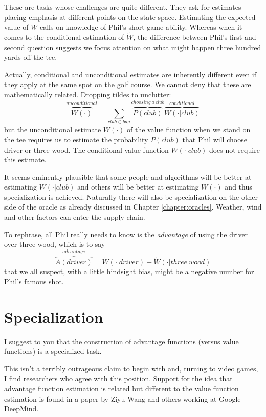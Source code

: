 These are tasks whose challenges are quite different. They ask for estimates placing emphasis at different points on the state space. Estimating the expected value of $W$ calls on knowledge of Phil's short game ability. Whereas when it comes to the conditional estimation of $\tilde{W}$, the difference between Phil's first and second question suggests we focus attention on what might happen three hundred yards off the tee.   

Actually, conditional and unconditional estimates are inherently different even if they apply at the same spot on the golf course. We cannot deny that these are mathematically related. Dropping tildes to unclutter:
$$
           \overbrace{W(\cdot)}^{unconditional} = \sum_{club \in bag} \overbrace{P(club)}^{choosing\ a\ club } \overbrace{W(\cdot | club)}^{conditional}
$$
but the unconditional estimate $W(\cdot)$ of the value function when we stand on the tee requires us to estimate the probability $P(club)$ that Phil will choose driver or three wood. The conditional value function $W(\cdot|club)$ does not require this estimate. 

It seems eminently plausible that some people and algorithms will be better at estimating $W(\cdot|club)$ and others will be better at estimating $W(\cdot)$ and thus specialization is achieved. Naturally there will also be  specialization on the other side of the oracle as already discussed in Chapter \ref{chapter:oracles}. Weather, wind and other factors can enter the supply chain. 

To rephrase, all Phil really needs to know is the {\em advantage} of using the driver over three wood, which is to say 
$$
       \overbrace{A(driver)}^{advantage} = \tilde{W}(\cdot|driver) - \tilde{W}(\cdot|three\ wood)
$$
that we all suspect, with a little hindsight bias, might be a negative number for Phil's famous shot. 

\section{Specialization}

I suggest to you that the construction of advantage functions (versus value functions) is a specialized task. 

This isn't a terribly outrageous claim to begin with and, turning to video games, I find researchers who agree with this position. Support for the idea that advantage function estimation is related but different to the value function estimation is found in a paper by Ziyu Wang and others working at Google DeepMind. 


